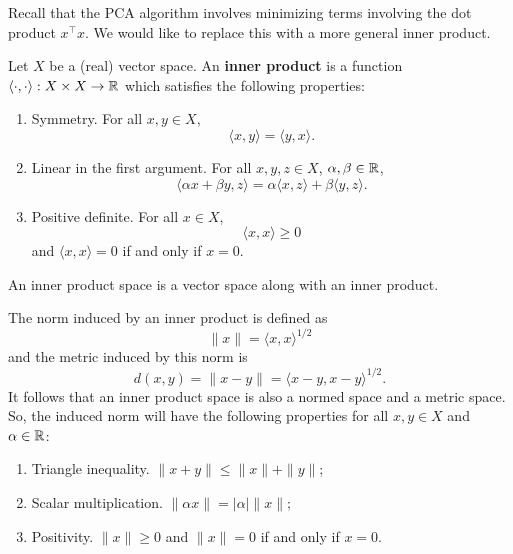 Recall that the PCA algorithm involves minimizing terms involving the dot product \(x^\top x\).
We would like to replace this with a more general inner product.

\begin{definition}
    \cite[p. 10]{small1994hilbert}
    Let \(X\) be a (real) vector space.
    An \textbf{inner product} is a function \(\langle \cdot, \cdot \rangle : X \times X \to \mathbb{R}\) which satisfies the following properties:
    \begin{enumerate}
        \item Symmetry. For all \(x,y \in X\),
        \[\langle x,y \rangle = \langle y, x \rangle.\]
        \item Linear in the first argument. For all \(x,y,z \in X\), \(\alpha, \beta \in \mathbb{R}\),
        \[\langle \alpha x + \beta y, z \rangle = \alpha \langle x, z \rangle + \beta \langle y, z \rangle.\]
        \item Positive definite. For all \(x \in X\),
        \[\langle x, x \rangle \geq 0\]
        and \(\langle x, x \rangle = 0\) if and only if \(x = 0\).
    \end{enumerate}
    An inner product space is a vector space along with an inner product.
\end{definition}

The norm induced by an inner product is defined as
\[\|x\| = \langle x, x \rangle^{1/2}\]
and the metric induced by this norm is
\[d(x,y) = \|x - y\| = \langle x-y, x-y \rangle^{1/2}.\]
It follows that an inner product space is also a normed space and a metric space.
So, the induced norm will have the following properties for all \(x,y \in X\) and \(\alpha \in \mathbb{R}\):
\begin{enumerate}
    \item Triangle inequality. \(\|x + y \| \leq \|x\| + \|y\|\);
    \item Scalar multiplication. \(\|\alpha x\| = |\alpha| \|x\|\);
    \item Positivity. \(\|x\| \geq 0\) and \(\|x\| = 0\) if and only if \(x = 0\). 
\end{enumerate}